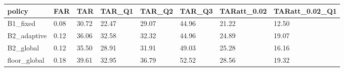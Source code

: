 \begin{tabular}{llllllll}
\hline
policy & FAR & TAR & TAR\_Q1 & TAR\_Q2 & TAR\_Q3 & TARatt\_0.02 & TARatt\_0.02\_Q1 \\
\hline
B1\_fixed & 0.08 & 30.72 & 22.47 & 29.07 & 44.96 & 21.22 & 12.50 \\
B2\_adaptive & 0.12 & 36.06 & 32.58 & 32.32 & 44.96 & 24.89 & 19.07 \\
B2\_global & 0.12 & 35.50 & 28.91 & 31.91 & 49.03 & 25.28 & 16.16 \\
floor\_global & 0.18 & 39.61 & 32.95 & 36.79 & 52.52 & 28.56 & 19.32 \\
\hline
\end{tabular}
